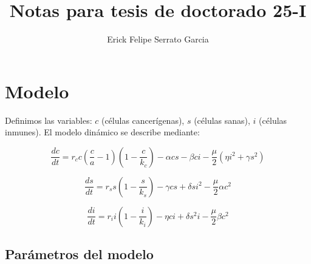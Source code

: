\documentclass{article}
\title{Notas para tesis de doctorado 25-I}
\author{Erick Felipe Serrato Garcia}
\begin{document}
\maketitle

\section{Modelo}

Definimos las variables: $c$ (células cancerígenas), $s$ (células sanas), $i$ (células inmunes). El modelo dinámico se describe mediante:

\begin{equation}
\frac{dc}{dt} = r_c c \left(\frac{c}{a} - 1\right)\left(1 - \frac{c}{k_c}\right) - \alpha c s - \beta c i - \frac{\mu}{2} (\eta i^2 + \gamma s^2)
\label{eqn:cancer_dynamic}
\end{equation}

\begin{equation}
\frac{ds}{dt} = r_s s \left(1 - \frac{s}{k_s}\right) - \gamma c s + \delta s i^2 - \frac{\mu}{2} \alpha c^2
\label{eqn:sano_dynamic}
\end{equation}

\begin{equation}
\frac{di}{dt} = r_i i \left(1 - \frac{i}{k_i}\right) - \eta c i + \delta s^2 i - \frac{\mu}{2} \beta c^2
\label{eqn:inmune_dynamic}
\end{equation}

\subsection*{Parámetros del modelo}
\end{document}
